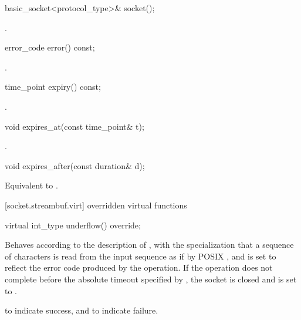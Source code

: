 \begin{itemdecl}
basic_socket<protocol_type>& socket();
\end{itemdecl}

\begin{itemdescr}
\pnum
\returns {}.
\end{itemdescr}

\begin{itemdecl}
error_code error() const;
\end{itemdecl}

\begin{itemdescr}
\pnum
\returns {}.
\end{itemdescr}

\begin{itemdecl}
time_point expiry() const;
\end{itemdecl}

\begin{itemdescr}
\pnum
\returns {}.
\end{itemdescr}

\begin{itemdecl}
void expires_at(const time_point& t);
\end{itemdecl}

\begin{itemdescr}
\pnum
\postconditions {}.
\end{itemdescr}

\begin{itemdecl}
void expires_after(const duration& d);
\end{itemdecl}

\begin{itemdescr}
\pnum
\effects Equivalent to .
\end{itemdescr}



[socket.streambuf.virt]{ overridden virtual functions}

\begin{itemdecl}
virtual int_type underflow() override;
\end{itemdecl}

\begin{itemdescr}
\pnum
\effects Behaves according to the description of , with the specialization that a sequence of characters is read from the input sequence as if by POSIX , and  is set to reflect the error code produced by the operation. If the operation does not complete before the absolute timeout specified by , the socket is closed and  is set to .

\pnum
\returns {} to indicate success,
and  to indicate failure.
\end{itemdescr}

